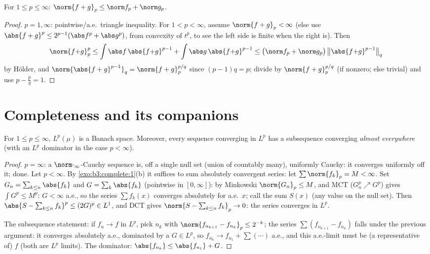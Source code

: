 \begin{theorem}\label{thm:b3:lp:minkowski}
For $1 \leq p \leq \infty$: $\norm{f + g}_p \leq \norm f_p +
\norm g_p$.
\end{theorem}

\begin{proof}
$p = 1, \infty$: pointwise/a.e.\ triangle inequality. For $1 <
p < \infty$, assume $\norm{f+g}_p < \infty$ (else use
$\abs{f+g}^p \leq 2^{p-1}(\abs f^p + \abs g^p)$, from convexity
of $t^p$, to see the left side is finite when the right is).
Then
\[
\norm{f{+}g}_p^p \leq \int\abs f\,\abs{f{+}g}^{p-1} +
\int\abs g\,\abs{f{+}g}^{p-1}
\leq \bigl(\norm f_p + \norm g_p\bigr)\,
\bigl\|\abs{f{+}g}^{p-1}\bigr\|_q
\]
by H\"older, and $\norm{\abs{f+g}^{p-1}}_q =
\norm{f+g}_p^{p/q}$ since $(p-1)q = p$; divide by
$\norm{f+g}_p^{p/q}$ (if nonzero; else trivial) and use $p -
\frac pq = 1$.
\end{proof}

\section{Completeness and its companions}

\begin{theorem}\label{thm:b3:lp:complete}
For $1 \leq p \leq \infty$, $L^p(\mu)$ is a Banach space.
Moreover, every sequence converging in $L^p$ has a subsequence
converging \emph{almost everywhere} (with an $L^p$ dominator
in the case $p < \infty$).
\end{theorem}

\begin{proof}
$p = \infty$: a $\norm\cdot_\infty$-Cauchy sequence is, off a
single null set (union of countably many), uniformly Cauchy:
it converges uniformly off it; done. Let $p < \infty$. By
\cref{exo:b3:complete:1}(b) it suffices to sum absolutely
convergent series: let $\sum\norm{f_k}_p = M < \infty$. Set
$G_n = \sum_{k \leq n}\abs{f_k}$ and $G = \sum_k\abs{f_k}$
(pointwise in $[0,\infty]$): by Minkowski $\norm{G_n}_p \leq
M$, and MCT ($G_n^p \nearrow G^p$) gives $\int G^p \leq M^p$:
$G < \infty$ a.e., so the series $\sum f_k(x)$ converges
absolutely for a.e.\ $x$; call the sum $S(x)$ (any value on
the null set). Then $\abs{S - \sum_{k\leq n}f_k}^p \leq (2G)^p
\in L^1$, and DCT gives $\norm{S - \sum_{k\leq n}f_k}_p \to 0$:
the series converges in $L^p$.

The subsequence statement: if $f_n \to f$ in $L^p$, pick $n_k$
with $\norm{f_{n_{k+1}} - f_{n_k}}_p \leq 2^{-k}$; the series
$\sum(f_{n_{k+1}} - f_{n_k})$ falls under the previous
argument: it converges absolutely a.e., dominated by a $G \in
L^p$, so $f_{n_k} \to f_{n_1} + \sum(\cdots) $ a.e., and this
a.e.-limit must be (a representative of) $f$ (both are $L^p$
limits). The dominator: $\abs{f_{n_k}} \leq \abs{f_{n_1}} + G$.
\end{proof}

